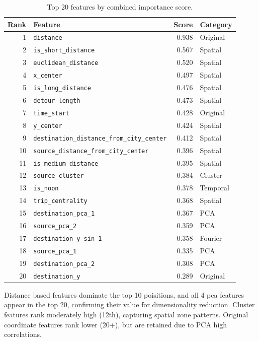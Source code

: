\begin{table}[htbp]
    \centering
    \caption{Top 20 features by combined importance score.}
    \label{tab:feature_selection_results}
    \begin{tabular}{rlrl}
        \toprule
        \textbf{Rank} & \textbf{Feature} & \textbf{Score} & \textbf{Category} \\
        \midrule
        1 & \texttt{distance} & 0.938 & Original \\
        2 & \texttt{is\_short\_distance} & 0.567 & Spatial \\
        3 & \texttt{euclidean\_distance} & 0.520 & Spatial \\
        4 & \texttt{x\_center} & 0.497 & Spatial \\
        5 & \texttt{is\_long\_distance} & 0.476 & Spatial \\
        6 & \texttt{detour\_length} & 0.473 & Spatial \\
        7 & \texttt{time\_start} & 0.428 & Original \\
        8 & \texttt{y\_center} & 0.424 & Spatial \\
        9 & \texttt{destination\_distance\_from\_city\_center} & 0.412 & Spatial \\
        10 & \texttt{source\_distance\_from\_city\_center} & 0.396 & Spatial \\
        11 & \texttt{is\_medium\_distance} & 0.395 & Spatial \\
        12 & \texttt{source\_cluster} & 0.384 & Cluster \\
        13 & \texttt{is\_noon} & 0.378 & Temporal \\
        14 & \texttt{trip\_centrality} & 0.368 & Spatial \\
        15 & \texttt{destination\_pca\_1} & 0.367 & PCA \\
        16 & \texttt{source\_pca\_2} & 0.359 & PCA \\
        17 & \texttt{destination\_y\_sin\_1} & 0.358 & Fourier \\
        18 & \texttt{source\_pca\_1} & 0.335 & PCA \\
        19 & \texttt{destination\_pca\_2} & 0.308 & PCA \\
        20 & \texttt{destination\_y} & 0.289 & Original \\
        \bottomrule
    \end{tabular}
\end{table}

Distance based features dominate the top 10 poisitions, and all 4 pca features appear in the top 20, confirming their value for dimensionality reduction.
Cluster features rank moderately high (12th), capturing spatial zone patterns.
Original coordinate features rank lower (20+), but are retained due to PCA high correlations.

